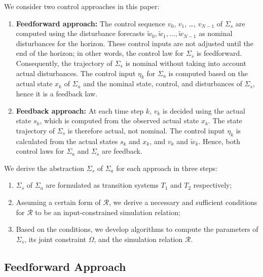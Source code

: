 We consider two control approaches in this paper:
\begin{enumerate}
\item \textbf{Feedforward approach:} The control sequence $v_{0}$, $v_{1}$, \dots, $v_{N-1}$ of $\Sigma_{s}$ are computed using the disturbance forecasts $\tilde{w}_{0}, \tilde{w}_{1}, \dots, \tilde{w}_{N-1}$ as nominal disturbances for the horizon.  These control inputs are not adjusted until the end of the horizon; in other words, the control law for $\Sigma_{s}$ is feedforward.  Consequently, the trajectory of $\Sigma_{s}$ is nominal without taking into account actual disturbances.  The control input $\eta_{k}$ for $\Sigma_{a}$ is computed based on the actual state $x_{k}$ of $\Sigma_{a}$ and the nominal state, control, and disturbances of $\Sigma_{s}$, hence it is a feedback law.
\item \textbf{Feedback approach:} At each time step $k$, $v_{k}$ is decided using the actual state $s_{k}$, which is computed from the observed actual state $x_{k}$. %
  The state trajectory of $\Sigma_{s}$ is therefore actual, not nominal.  The control input $\eta_{k}$ is calculated from the actual states $s_{k}$ and $x_{k}$, and $v_{k}$ and $\tilde{w}_{k}$.  Hence, both control laws for $\Sigma_{a}$ and $\Sigma_{s}$ are feedback.
\end{enumerate}

We derive the abstraction $\Sigma_{s}$ of $\Sigma_{a}$ for each approach in three steps:
\begin{enumerate}
\item $\Sigma_{s}$ of $\Sigma_{a}$ are formulated as transition systems $T_{1}$ and $T_{2}$ respectively;
\item Assuming a certain form of $\mathcal{R}$, we derive a necessary and sufficient conditions for $\mathcal{R}$ to be an input-constrained simulation relation;
\item Based on the conditions, we develop algorithms to compute the parameters of $\Sigma_{s}$, its joint constraint $\Omega$, and the simulation relation $\mathcal{R}$.
\end{enumerate}
%


\subsection{Feedforward Approach}
\label{sec:abstraction-gs:feedforward}

